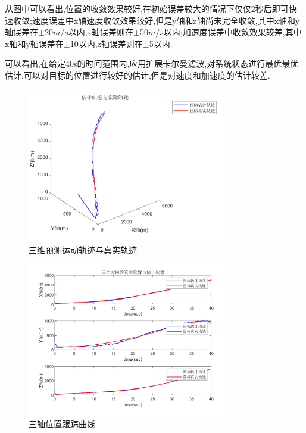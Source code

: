 \documentclass[12pt]{article}
\numberwithin{equation}{section} %
\begin{document}
从图中可以看出,位置的收敛效果较好,在初始误差较大的情况下仅仅2秒后即可快速收敛;速度误差中x轴速度收敛效果较好,但是y轴和z轴尚未完全收敛,其中x轴和y轴误差在$\pm$20$m/s$以内,x轴误差则在$\pm$50$m/s$以内;加速度误差中收敛效果较差,其中x轴和y轴误差在$\pm$10以内,z轴误差则在$\pm$5以内.

可以看出,在给定40s的时间范围内,应用扩展卡尔曼滤波,对系统状态进行最优最优估计,可以对目标的位置进行较好的估计,但是对速度和加速度的估计较差.
\begin{figure}[hb]  %
    \centering
    \includegraphics[width=0.8\textwidth]{Fig/预测运动轨迹与真实轨迹三维.png} %
    \caption{三维预测运动轨迹与真实轨迹}
    \label{fig:预测运动轨迹与真实轨迹三维} %
\end{figure}

\begin{figure}  %
    \centering
    \includegraphics[width=0.8\textwidth]{Fig/三轴位置跟踪曲线.png} %
    \caption{三轴位置跟踪曲线}
    \label{fig:三轴位置跟踪曲线} %
\end{figure}
\end{document}
